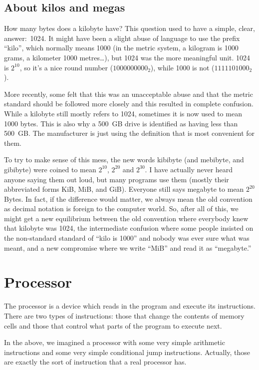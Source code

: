 \subsection{About kilos and megas}

How many bytes does a kilobyte have? This question used to have a simple,
clear, answer:~1024. It might have been a slight abuse of language to use the
prefix ``kilo'', which normally means 1000 (in the metric system, a kilogram is
1000 grams, a kilometer 1000 metres\ldots), but 1024 was the more meaningful
unit. 1024 is $2^{10}$, so it's a nice round number ($1000000000_2$), while
1000 is not ($1111101000_2$).

More recently, some felt that this was an unacceptable abuse and that the
metric standard should be followed more closely and this resulted in complete
confusion. While a kilobyte still mostly refers to 1024, sometimes it is now
used to mean 1000 bytes. This is also why a 500~GB drive is identified as
having less than 500~GB. The manufacturer is just using the definition that is
most convenient for them.

To try to make sense of this mess, the new words kibibyte (and mebibyte, and
gibibyte) were coined to mean $2^{10}$, $2^{20}$ and $2^{30}$. I have actually
never heard anyone saying them out loud, but many programs use them
(mostly their abbreviated forms KiB, MiB, and GiB). Everyone still says
megabyte to mean $2^{20}$ Bytes. In fact, if the difference would matter, we
always mean the old convention as decimal notation is foreign to the computer
world. So, after all of this, we might get a new equilibrium between the old
convention where everybody knew that kilobyte was 1024, the intermediate
confusion where some people insisted on the non-standard standard of ``kilo is
1000'' and nobody was ever sure what was meant, and a new compromise where we
write ``MiB'' and read it as ``megabyte.''

\section{Processor}

The processor is a device which reads in the program and execute its
instructions. There are two types of instructions: those that change the
contents of memory cells and those that control what parts of the program to
execute next.

In the above, we imagined a processor with some very simple arithmetic
instructions and some very simple conditional jump instructions. Actually,
those are exactly the sort of instruction that a real processor has.


